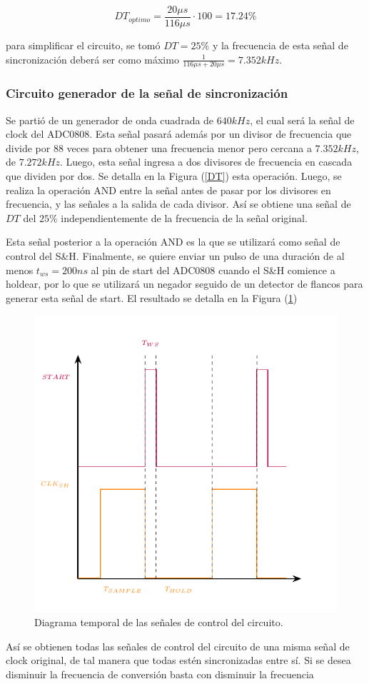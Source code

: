 \begin{equation}
DT_{optimo} = \frac{20\mu s}{116\mu s}\cdot 100 = 17.24\% 
\end{equation}

para simplificar el circuito, se tomó $DT = 25\%$ y la frecuencia de esta señal de sincronización deberá ser como máximo $\frac{1}{116\mu s + 20\mu s} = 7.352kHz$.

\subsubsection{Circuito generador de la señal de sincronización}

Se partió de un generador de onda cuadrada de $640kHz$, el cual será la señal de clock del ADC0808. Esta señal pasará además por un divisor de frecuencia que divide por $88$ veces para obtener una frecuencia menor pero cercana a $7.352kHz$, de $7.272kHz$. Luego, esta señal ingresa a dos divisores de frecuencia en cascada que dividen por dos. Se detalla en la Figura (\ref{DT}) esta operación. Luego, se realiza la operación AND entre la señal antes de pasar por los divisores en frecuencia, y las señales a la salida de cada divisor. Así se obtiene una señal de $DT$ del $25\%$ independientemente de la frecuencia de la señal original.


Esta señal posterior a la operación AND es la que se utilizará como señal de control del S\&H. Finalmente, se quiere enviar un pulso de una duración de al menos $t_{ws} = 200ns$ al pin de start del ADC0808 cuando el S\&H comience a holdear, por lo que se utilizará un negador seguido de un detector de flancos para generar esta señal de start. El resultado se detalla en la Figura (\ref{START})

\begin{figure}[H]
\centering
\includegraphics[width=0.8\linewidth]{ImagenesEjercicio1/Graficos.pdf}
\caption{Diagrama temporal de las señales de control del circuito.}
\label{START}
\end{figure}

Así se obtienen todas las señales de control del circuito de una misma señal de clock original, de tal manera que todas estén sincronizadas entre sí. Si se desea disminuir la frecuencia de conversión basta con disminuir la frecuencia 


